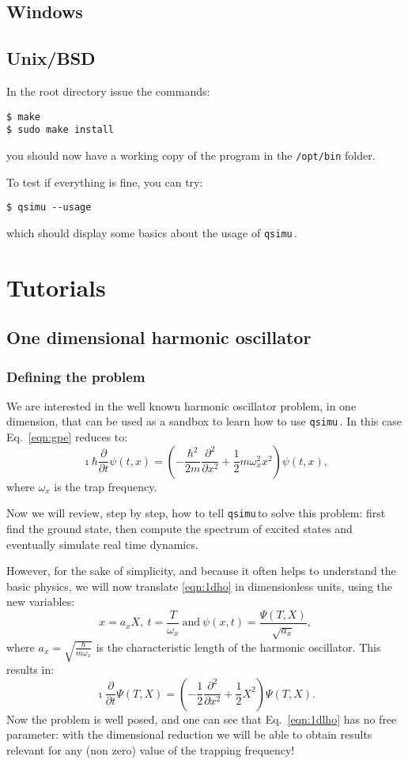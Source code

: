 \documentclass[12pt,a4paper]{report}
\newcommand{\qsimu}{\texttt{qsimu}\,}
\begin{document}
\subsection{Windows}

\subsection{Unix/BSD}
In the root directory issue the commands:
\begin{verbatim}
$ make
$ sudo make install
\end{verbatim}
you should now have a working copy of the program in the \texttt{/opt/bin} folder.

To test if everything is fine, you can try:
\begin{verbatim}
$ qsimu --usage
\end{verbatim}
which should display some basics about the usage of \qsimu.

\section{Tutorials}
\subsection{One dimensional harmonic oscillator}
\subsubsection{Defining the problem}
We are interested in the well known harmonic oscillator problem, in one dimension, that can be used as a sandbox to learn how to use \qsimu. 
In this case Eq.~\eqref{eqn:gpe} reduces to:
\begin{equation}
\imath\hbar\frac{\partial}{\partial t}\psi(t,x)=\left(-\frac{\hbar^2}{2m}\frac{\partial^2}{\partial x^2}+\frac{1}{2}m\omega_x^2 x^2\right)\psi(t,x),
\label{eqn:1dho}
\end{equation}
where $\omega_x$ is the trap frequency.

Now we will review, step by step, how to tell \qsimu to solve this problem: first find the ground state, then compute the spectrum of excited states and eventually simulate real time dynamics.

However, for the sake of simplicity, and because it often helps to understand the basic physics, we will now translate \eqref{eqn:1dho} in dimensionless units, using the new variables:
\begin{equation*}
x=a_xX,~t=\frac{T}{\omega_x}~\textrm{and}~\psi(x,t)=\frac{\Psi(T,X)}{\sqrt{a_x}},
\end{equation*}
where $a_x=\sqrt{\frac{\hbar}{m\omega_x}}$ is the characteristic length of the harmonic oscillator.
This results in:
\begin{equation}
\imath\frac{\partial}{\partial t}\Psi(T,X)=\left(-\frac{1}{2}\frac{\partial^2}{\partial x^2}+\frac{1}{2}X^2\right)\Psi(T,X).
\label{eqn:1dlho}
\end{equation}
Now the problem is well posed, and one can see that Eq.~\eqref{eqn:1dlho} has no free parameter: with the dimensional reduction we will be able to obtain results relevant for any (non zero) value of the trapping frequency!
\end{document}

